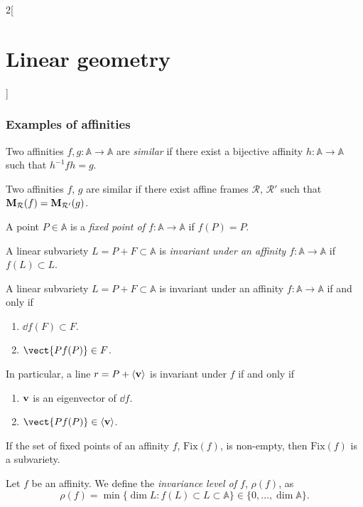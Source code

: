\documentclass[../../../main.tex]{subfiles}
\begin{document}
\begin{multicols}{2}[\section{Linear geometry}]
    \subsubsection{Examples of affinities}
    \begin{definition}
        Two affinities $f,g:\mathbb{A}\rightarrow\mathbb{A}$ are \textit{similar} if there exist a bijective affinity $h:\mathbb{A}\rightarrow\mathbb{A}$ such that $h^{-1}fh=g$.
    \end{definition}
    \begin{prop}
        Two affinities $f$, $g$ are similar if there exist affine frames $\mathcal{R}$, $\mathcal{R}'$ such that $\boldsymbol{\mathrm{M}}_\mathcal{R}(f)=\boldsymbol{\mathrm{M}}_{\mathcal{R}'}(g)$.
    \end{prop}
    \begin{definition}
        A point $P\in\mathbb{A}$ is a \textit{fixed point of $f:\mathbb{A}\rightarrow\mathbb{A}$} if $f(P)=P$.
    \end{definition}
    \begin{definition}
        A linear subvariety $L=P+F\subset\mathbb{A}$ is \textit{invariant under an affinity $f:\mathbb{A}\rightarrow\mathbb{A}$} if $f(L)\subset L$.
    \end{definition}
    \begin{prop}
        A linear subvariety $L=P+F\subset\mathbb{A}$ is invariant under an affinity $f:\mathbb{A}\rightarrow\mathbb{A}$ if and only if
        \begin{enumerate}
            \item $\dd f(F)\subset F$.
            \item $\vect{Pf(P)}\in F$.
        \end{enumerate} In particular, a line $r=P+\langle\boldsymbol{\mathrm{v}}\rangle$ is invariant under $f$ if and only if
        \begin{enumerate}
            \item $\boldsymbol{\mathrm{v}}$ is an eigenvector of $\dd f$.
            \item $\vect{Pf(P)}\in\langle\vf{v}\rangle$.
        \end{enumerate}
    \end{prop}
    \begin{prop}
        If the set of fixed points of an affinity $f$, $\text{Fix}(f)$, is non-empty, then $\text{Fix}(f)$ is a subvariety.
    \end{prop}
    \begin{definition}
        Let $f$ be an affinity. We define the \textit{invariance level of $f$}, $\rho(f)$, as $$\rho(f)=\min\{\dim L:f(L)\subset L\subset\mathbb{A}\}\in\{0,\ldots,\dim\mathbb{A}\}.$$

\end{definition}
\end{multicols}
\end{document}
